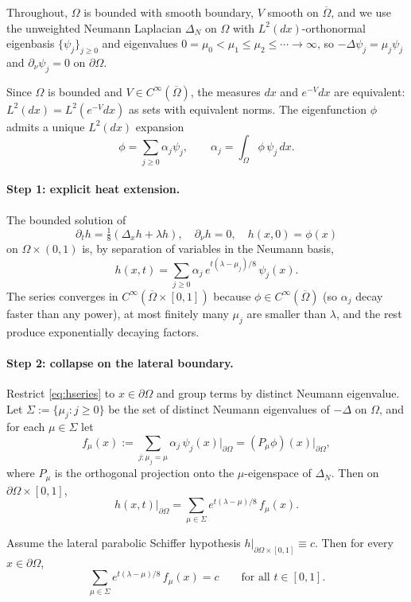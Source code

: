 \documentclass[11pt]{article}
\newcommand{\Om}{\Omega}
\newcommand{\1}{\mathbf 1}
\newcommand{\nor}{\partial_\nu}
\begin{document}
Throughout, $\Om$ is bounded with smooth boundary, $V$ smooth on
$\overline\Om$, and we use the unweighted Neumann Laplacian
$\Delta_N$ on $\Om$ with $L^2(dx)$-orthonormal eigenbasis
$\{\psi_j\}_{j\ge 0}$ and eigenvalues
$0=\mu_0<\mu_1\le\mu_2\le\cdots\to\infty$, so $-\Delta\psi_j=\mu_j\psi_j$
and $\nor\psi_j=0$ on $\partial\Om$.

Since $\Om$ is bounded and $V\in C^\infty(\overline\Om)$, the measures
$dx$ and $e^{-V}dx$ are equivalent: $L^2(dx)=L^2(e^{-V}dx)$ as sets
with equivalent norms. The eigenfunction $\phi$ admits a unique
$L^2(dx)$ expansion
\[
    \phi=\sum_{j\ge 0}\alpha_j\psi_j,\qquad
    \alpha_j=\int_\Om\phi\,\psi_j\,dx.
\]

\paragraph{Step 1: explicit heat extension.}
The bounded solution of
\[
    \partial_t h=\tfrac{1}{8}(\Delta_x h+\lambda h),\quad
    \nor h=0,\quad h(x,0)=\phi(x)
\]
on $\Om\times(0,1)$ is, by separation of variables in the Neumann
basis,
\begin{equation}\label{eq:hseries}
    h(x,t)=\sum_{j\ge 0}\alpha_j\,e^{t(\lambda-\mu_j)/8}\,\psi_j(x).
\end{equation}
The series converges in $C^\infty(\overline\Om\times[0,1])$ because
$\phi\in C^\infty(\overline\Om)$ (so $\alpha_j$ decay faster than any
power), at most finitely many $\mu_j$ are smaller than $\lambda$, and
the rest produce exponentially decaying factors.

\paragraph{Step 2: collapse on the lateral boundary.}
Restrict \eqref{eq:hseries} to $x\in\partial\Om$ and group terms by
distinct Neumann eigenvalue. Let $\Sigma:=\{\mu_j:j\ge 0\}$ be the set
of distinct Neumann eigenvalues of $-\Delta$ on $\Om$, and for each
$\mu\in\Sigma$ let
\[
    f_\mu(x):=\sum_{j:\mu_j=\mu}\alpha_j\,\psi_j(x)|_{\partial\Om}
        =(P_\mu\phi)(x)\big|_{\partial\Om},
\]
where $P_\mu$ is the orthogonal projection onto the $\mu$-eigenspace
of $\Delta_N$. Then on $\partial\Om\times[0,1]$,
\begin{equation}\label{eq:lateral}
    h(x,t)\big|_{\partial\Om}
    =\sum_{\mu\in\Sigma} e^{t(\lambda-\mu)/8}\,f_\mu(x).
\end{equation}

Assume the lateral parabolic Schiffer hypothesis
$h|_{\partial\Om\times[0,1]}\equiv c$. Then for every $x\in\partial\Om$,
\begin{equation}\label{eq:scalar}
    \sum_{\mu\in\Sigma} e^{t(\lambda-\mu)/8}\,f_\mu(x)=c
    \qquad\text{for all }t\in[0,1].
\end{equation}
\end{document}

